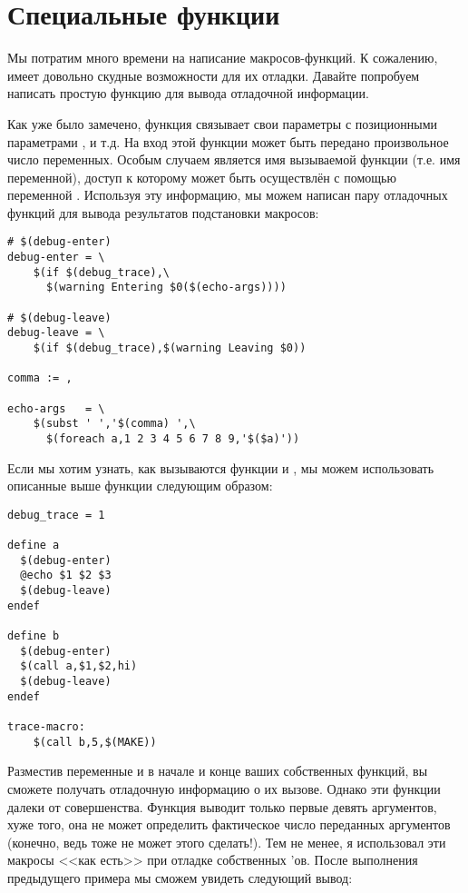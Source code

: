 \section{Специальные функции}
\label{sec:advanced_user_def_func}

Мы потратим много времени на написание макросов-функций. К сожалению,
\GNUmake{} имеет довольно скудные возможности для их отладки. Давайте
попробуем написать простую функцию для вывода отладочной информации.

Как уже было замечено, функция  связывает свои
параметры с позиционными параметрами ,  и
т.д. На вход этой функции может быть передано произвольное число
переменных. Особым случаем является имя вызываемой функции (т.е. имя
переменной), доступ к которому может быть осуществлён с помощью
переменной . Используя эту информацию, мы можем
написан пару отладочных функций для вывода результатов подстановки
макросов:

{\footnotesize
\begin{verbatim}
# $(debug-enter)
debug-enter = \
    $(if $(debug_trace),\
      $(warning Entering $0($(echo-args))))

# $(debug-leave)
debug-leave = \
    $(if $(debug_trace),$(warning Leaving $0))

comma := ,

echo-args   = \
    $(subst ' ','$(comma) ',\
      $(foreach a,1 2 3 4 5 6 7 8 9,'$($a)'))
\end{verbatim}
}

Если мы хотим узнать, как вызываются функции  и
\function{b}, мы можем использовать описанные выше функции следующим
образом:

{\footnotesize
\begin{verbatim}
debug_trace = 1

define a
  $(debug-enter)
  @echo $1 $2 $3
  $(debug-leave)
endef

define b
  $(debug-enter)
  $(call a,$1,$2,hi)
  $(debug-leave)
endef

trace-macro:
    $(call b,5,$(MAKE))
\end{verbatim}
}

Разместив переменные  и 
в начале и конце ваших собственных функций, вы сможете получать
отладочную информацию о их вызове. Однако эти функции далеки от
совершенства. Функция  выводит только первые
девять аргументов, хуже того, она не может определить фактическое
число переданных аргументов (конечно, ведь \GNUmake{} тоже не может этого
сделать!). Тем не менее, я использовал эти макросы <<как есть>>
при отладке собственных \Makefile{}'ов. После выполнения предыдущего
примера мы сможем увидеть следующий вывод:

